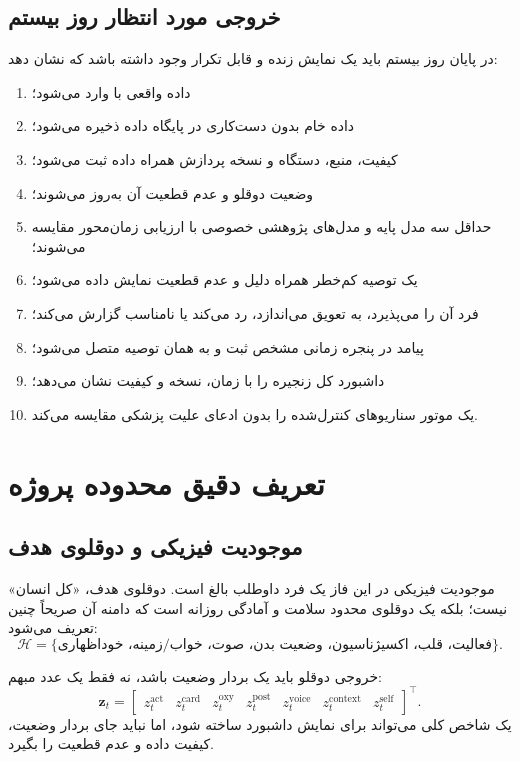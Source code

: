 \documentclass[11pt,a4paper]{article}
\newcommand{\en}[1]{\lr{#1}}
\begin{document}
\subsection{خروجی مورد انتظار روز بیستم}
در پایان روز بیستم باید یک نمایش زنده و قابل تکرار وجود داشته باشد که نشان دهد:
\begin{enumerate}
  \item داده واقعی با \en{event time} وارد می‌شود؛
  \item داده خام بدون دست‌کاری در پایگاه داده ذخیره می‌شود؛
  \item کیفیت، منبع، دستگاه و نسخه پردازش همراه داده ثبت می‌شود؛
  \item وضعیت دوقلو و عدم قطعیت آن به‌روز می‌شوند؛
  \item حداقل سه مدل پایه و مدل‌های پژوهشی خصوصی با ارزیابی زمان‌محور مقایسه می‌شوند؛
  \item یک توصیه کم‌خطر همراه دلیل و عدم قطعیت نمایش داده می‌شود؛
  \item فرد آن را می‌پذیرد، به تعویق می‌اندازد، رد می‌کند یا نامناسب گزارش می‌کند؛
  \item پیامد در پنجره زمانی مشخص ثبت و به همان توصیه متصل می‌شود؛
  \item داشبورد کل زنجیره را با زمان، نسخه و کیفیت نشان می‌دهد؛
  \item یک موتور \en{what-if} سناریوهای کنترل‌شده را بدون ادعای علیت پزشکی مقایسه می‌کند.
\end{enumerate}

\section{تعریف دقیق محدوده پروژه}

\subsection{موجودیت فیزیکی و دوقلوی هدف}
موجودیت فیزیکی در این فاز یک فرد داوطلب بالغ است. دوقلوی هدف، «کل انسان» نیست؛ بلکه یک دوقلوی محدود سلامت و آمادگی روزانه است که دامنه آن صریحاً چنین تعریف می‌شود:
\[
\mathcal{H}=\{\text{فعالیت، قلب، اکسیژناسیون، وضعیت بدن، صوت، خواب/زمینه، خوداظهاری}\}.
\]

خروجی دوقلو باید یک بردار وضعیت باشد، نه فقط یک عدد مبهم:
\begin{equation}
\mathbf{z}_t=
\begin{bmatrix}
 z_t^{\mathrm{act}} &
 z_t^{\mathrm{card}} &
 z_t^{\mathrm{oxy}} &
 z_t^{\mathrm{post}} &
 z_t^{\mathrm{voice}} &
 z_t^{\mathrm{context}} &
 z_t^{\mathrm{self}}
\end{bmatrix}^{\top}.
\end{equation}
یک شاخص کلی می‌تواند برای نمایش داشبورد ساخته شود، اما نباید جای بردار وضعیت، کیفیت داده و عدم قطعیت را بگیرد.
\end{document}
